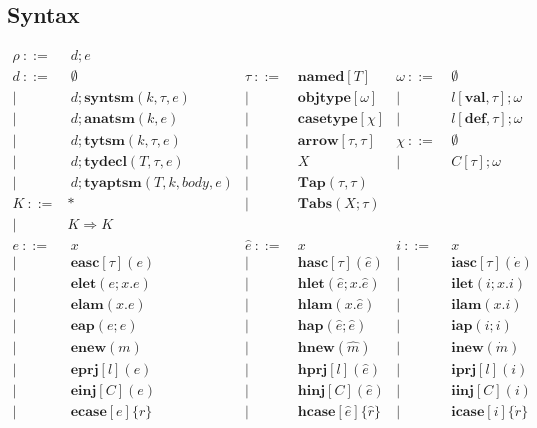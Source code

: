 \documentclass[letterpaper, notitlepage]{article}
\begin{document}
\subsection{Syntax}
\[
\begin{array}{rlrlrl}
	\rho		~::=&~ {d};e\\				
	{d}		~::=&~ \emptyset								&\tau 		~::=&~ \mathbf{named}[T]	& \omega 		~::=&~ 	\emptyset\\
				| ~	&~ {d}; \mathbf{syntsm}(k,\tau,e)	&|~	& ~ \mathbf{objtype}[\omega]		& |~&  	~l[\mathbf{val}, \tau];\omega\\
				| ~	&~ {d}; \mathbf{anatsm}(k,e)		&|~	& ~ \mathbf{casetype}[\chi]			& |~&	~l[\mathbf{def}, \tau];\omega\\
				| ~	&~ {d};\mathbf{tytsm}(k,\tau,e)				&|~ & ~ \mathbf{arrow}[\tau, \tau]		& \chi 			~::=&~	\emptyset ~ \\
				| ~ &~ {d};\mathbf{tydecl}(T,\tau,e)			&|~	& ~ X									& |~&	~C[\tau];\omega\\
				| ~ &~ {d};\mathbf{tyaptsm}(T,k,body,e)			&|~ & ~ \mathbf{Tap}(\tau,\tau)\\
	K           ~::=& *											&|~ & ~ \mathbf{Tabs}(X;\tau)\\
				| ~ & K\Rightarrow K\\
	e 			~::=&~ x 								&\hat{e}	~::=&~ 	x 										& i 		~::=&~ 	x\\
				| ~ &~ \mathbf{easc}[\tau](e)			& 		 	| ~ &~ 	\mathbf{hasc}[\tau](\hat{e})			& 		 	| ~ &~	\mathbf{iasc}[\tau](\dot{e})\\
				| ~ &~ \mathbf{elet}(e; x.e)     		& 		 	| ~ &~ 	\mathbf{hlet}(\hat{e}; x.\hat{e})		& 		 	| ~ &~	\mathbf{ilet}(i;x.i)\\
				| ~ &~ \mathbf{elam}(x.e)     			& 		 	| ~ &~ 	\mathbf{hlam}(x.\hat{e})				& 		 	| ~ &~	\mathbf{ilam}(x.i)\\
				| ~ &~ \mathbf{eap}(e;e)     			& 		 	| ~ &~ 	\mathbf{hap}(\hat{e};\hat{e})			& 		 	| ~ &~	\mathbf{iap}(i;i)\\
				| ~ &~ \mathbf{enew}(m)     			& 		 	| ~ &~	\mathbf{hnew}(\hat{m})					& 		 	| ~ &~	\mathbf{inew}(\dot{m})\\
				| ~ &~ \mathbf{eprj}[l](e)     			& 		 	| ~ &~	\mathbf{hprj}[l](\hat{e})				& 		 	| ~ &~	\mathbf{iprj}[l](i)\\
				| ~ &~ \mathbf{einj}[C](e)     			& 		 	| ~ &~	\mathbf{hinj}[C](\hat{e})				& 		 	| ~ &~	\mathbf{iinj}[C](i)\\
				| ~ &~ \mathbf{ecase}[e]\{r\}     		& 		 	| ~ &~	\mathbf{hcase}[\hat{e}]\{\hat{r}\}		& 		 	| ~ &~	\mathbf{icase}[i]\{\dot{r}\}\\

\end{array}\]
\end{document}
